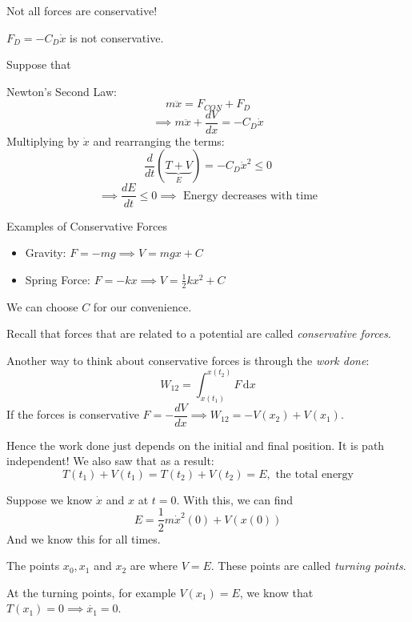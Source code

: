 Not all forces are conservative!\\

\begin{example}
$F_D = -C_D\dot{x}$	is not conservative. 

Suppose that 
\vspace*{80pt}

Newton's Second Law:
\[m\ddot{x} = F_{CON} + F_D\]
\[\implies m\ddot{x} + \frac{dV}{dx} = -C_D\dot{x}\]
Multiplying by $\dot{x}$ and rearranging the terms:
\[\frac{d}{dt}(\underbrace{T + V}_{E}) = -C_D\dot{x}^2 \leq 0\]
\[\implies \frac{dE}{dt} \leq 0 \implies \text{ Energy decreases with time}\]
\end{example}

Examples of Conservative Forces
\begin{examples}
\begin{itemize}
\item Gravity: $F = -mg \implies V = mgx + C$	
\item Spring Force: $F = -kx \implies V = \frac{1}{2}kx^2 + C$
\end{itemize}
We can choose $C$ for our convenience. 
\end{examples}

Recall that forces that are related to a potential are called \emph{conservative forces}.

 Another way to think about conservative forces is through the \emph{work done}:
\[W_{12} = \int_{x(t_1)}^{x(t_2)}F\,\mathrm{d}x	\]
If the forces is conservative $F = -\dfrac{dV}{dx} \implies W_{12} = -V(x_2) + V(x_1)$. 

Hence the work done just depends on the initial and final position. It is path independent! We also saw that as a result:
\[T(t_1) + V(t_1) = T(t_2) + V(t_2) = E, \text{ the total energy}\]

\pagebreak



Suppose we know $\dot{x}$ and $x$ at $t = 0$. With this, we can find
\[E = \frac{1}{2}m\dot{x}^2(0) + V(x(0))\]
And we know this for all times.~\\

\begin{definition} The points $x_0,x_1$ and $x_2$ are where $V = E$. These points are called \emph{turning points}.
	
\end{definition}
At the turning points, for example $V(x_1) = E$, we know that $T(x_1) = 0 \implies \dot{x_1} = 0$. 

